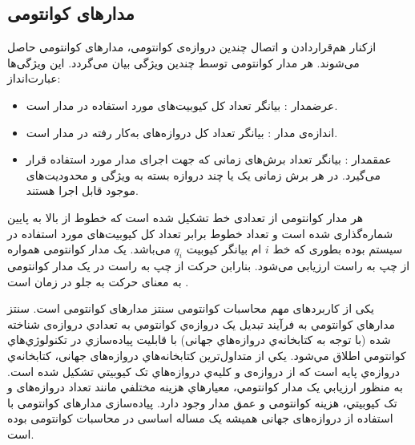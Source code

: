\begin{itemize}

\end{itemize}
\subsection{مدارهای کوانتومی}

ازکنار هم‌قرار‌دادن و اتصال چندین دروازه‌ی کوانتومی، مدارهای کوانتومی  حاصل می‌شوند. هر مدار کوانتومی توسط چندین ویژگی بیان می‌گردد\cite{pham20132d}. این ویژگی‌ها عبارت‌اند‌‌از:
\begin{itemize}
\item
عرضمدار : بیانگر تعداد کل کیوبیت‌های مورد استفاده در مدار است.
\item
اندازه‌ی مدار : بیانگر تعداد کل دروازه‌های به‌کار رفته در مدار است.
\item
عمقمدار : بیانگر تعداد برش‌های زمانی که جهت اجرای مدار مورد استفاده قرار می‌گیرد. در هر برش زمانی یک یا چند دروازه بسته به ویژگی و محدودیت‌های موجود قابل اجرا هستند.
\end{itemize}
هر مدار کوانتومی از تعدادی خط تشکیل شده است که خطوط از بالا به پایین شماره‌گذاری شده است و تعداد خطوط برابر تعداد کل کیوبیت‌های مورد استفاده در سیستم بوده بطوری که خط $i$ ام بیانگر کیوبیت $q_{i}$ می‌باشد. یک مدار کوانتومی همواره از چپ به راست ارزیابی می‌شود. بنارابن حرکت از چپ به راست در یک مدار کوانتومی به معنای حرکت به جلو در زمان است \cite{khalid2004fpga}.

یکی از کاربردهای مهم محاسبات کوانتومی سنتز مدارهای کوانتومی است. سنتز مدارهاي کوانتومي به فرآيند تبديل يک دروازه‌ي کوانتومي به تعدادي دروازه‌‌ی شناخته شده (با توجه به کتابخانه‌ي دروازه‌هاي جهانی) با قابليت پياده‌سازي در تکنولوژي‌هاي کوانتومي اطلاق مي‌شود. يکي از متداول‌ترين کتابخانه‌هاي دروازه‌های جهانی،  کتابخانه‌ي دروازه‌‌ي پايه است که از دروازه‌ی  و کليه‌ي دروازه‌هاي تک کيوبيتي تشکيل شده است. به منظور ارزيابي يک مدار کوانتومي، معيارهاي هزينه مختلفي مانند تعداد دروازه‌های  و تک کيوبيتي، هزينه کوانتومی و عمق مدار وجود دارد. پیاده‌سازی مدارهای کوانتومی با استفاده از دروازه‌های جهانی همیشه یک مساله اساسی در محاسبات کوانتومی بوده است. 

